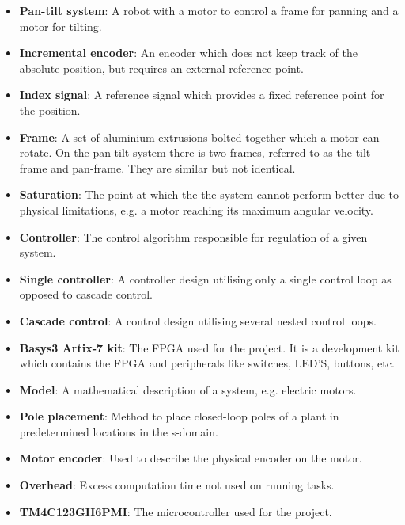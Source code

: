 \documentclass[../../main.tex]{subfiles}
\begin{document}
\label{sec:wordlist}
\begin{itemize}
    \item \textbf{Pan-tilt system}: A robot with a motor to control a frame for panning and a motor for tilting.
    \item \textbf{Incremental encoder}: An encoder which does not keep track of the absolute position, but requires an external reference point.
    \item \textbf{Index signal}: A reference signal which provides a fixed reference point for the position.
    \item \textbf{Frame}: A set of aluminium extrusions bolted together which a motor can rotate. On the pan-tilt system there is two frames, referred to as the tilt-frame and pan-frame. They are similar but not identical.
    \item \textbf{Saturation}: The point at which the the system cannot perform better due to physical limitations, e.g. a motor reaching its maximum angular velocity.
    \item \textbf{Controller}: The control algorithm responsible for regulation of a given system.
    \item \textbf{Single controller}: A controller design utilising only a single control loop as opposed to cascade control.
    \item \textbf{Cascade control}: A control design utilising several nested control loops.
    \item \textbf{Basys3 Artix-7 kit}: The FPGA used for the project. It is a development kit which contains the FPGA and peripherals like switches, LED'S, buttons, etc.
    \item \textbf{Model}: A mathematical description of a system, e.g. electric motors. 
    \item \textbf{Pole placement}: Method to place closed-loop poles of a plant in predetermined locations in the s-domain.
    \item \textbf{Motor encoder}: Used to describe the physical encoder on the motor.
    \item \textbf{Overhead}: Excess computation time not used on running tasks.
    \item \textbf{TM4C123GH6PMI}: The microcontroller used for the project.
    

\end{itemize}
\end{document}
